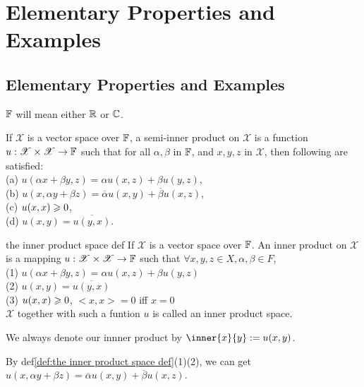 \chapter{Elementary Properties and Examples}\label{chp:1_1}
\section{Elementary Properties and Examples}
\begin{remark}
    $\mathbb{F}$ will mean either $\mathbb{R}$ or $\mathbb{C}$.
\end{remark}

\begin{definition}{}{}
    If $\mathscr{X}$ is a vector space over $\mathbb{F}$, a semi-inner product on $\mathscr{X}$ is 
    a function $u:\mathscr{X}\times \mathscr{X}\rightarrow \mathbb{F}$ such that for all $\alpha,\beta$ in $\mathbb{F}$,
    and $x,y,z$ in $\mathscr{X}$, then following are satisfied:\\
    (a) $u(\alpha x+\beta y,z)=\alpha u(x,z)+\beta u(y,z)$,\\
    (b) $u(x,\alpha y+\beta z)=\overline{\alpha}u(x,y)+\overline{\beta}u(x,z)$,\\
    (c) $u(x,x)\geqslant 0$,\\
    (d) $u(x,y)=\overline{u(y,x)}$.
\end{definition}


\begin{definition}{}{the inner product space def}
    If $\mathscr{X}$ is a vector space over $\mathbb{F}$. An inner product on $\mathscr{X}$ is a mapping $u:\mathscr{X}\times \mathscr{X}\rightarrow \mathbb{F}$ 
    such that $\forall x,y,z\in X,\alpha,\beta \in F$,\\
    (1) $u(\alpha x+\beta y,z)=\alpha u(x,z)+\beta u(y,z)$\\
    (2) $u(x,y)=\overline{u(y,x)}$\\
    (3) $u(x,x)\geqslant 0$,  $<x,x>=0$ iff $x=0$\\
    $\mathscr{X}$ together with such a funtion $u$ is called an inner product space.
\end{definition}

\begin{remark}
    We always denote our innner product by $\inner{x}{y}:=u(x,y)$. 
\end{remark}
\begin{remark}
    By def\ref{def:the inner product space def}(1)(2), we can get $u(x,\alpha y + \beta z)=\overline{\alpha} u(x,y) +\overline{\beta} u(x,z)$.
\end{remark}

